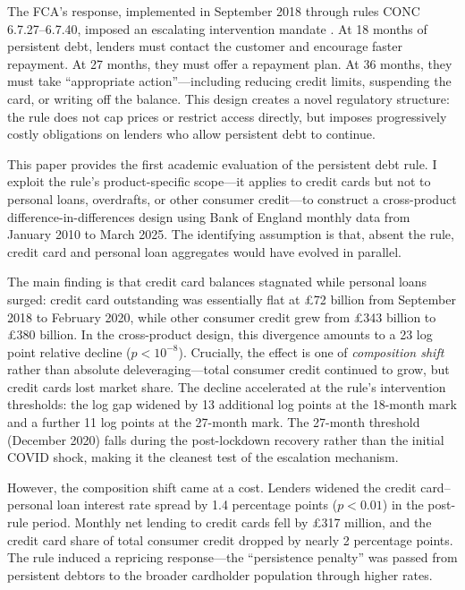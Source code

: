 \documentclass[12pt]{article}
\begin{document}
The FCA's response, implemented in September 2018 through rules CONC 6.7.27--6.7.40, imposed an escalating intervention mandate \citep{fca2018ps184}. At 18 months of persistent debt, lenders must contact the customer and encourage faster repayment. At 27 months, they must offer a repayment plan. At 36 months, they must take ``appropriate action''---including reducing credit limits, suspending the card, or writing off the balance. This design creates a novel regulatory structure: the rule does not cap prices or restrict access directly, but imposes progressively costly obligations on lenders who allow persistent debt to continue.

This paper provides the first academic evaluation of the persistent debt rule. I exploit the rule's product-specific scope---it applies to credit cards but not to personal loans, overdrafts, or other consumer credit---to construct a cross-product difference-in-differences design using Bank of England monthly data from January 2010 to March 2025. The identifying assumption is that, absent the rule, credit card and personal loan aggregates would have evolved in parallel.

The main finding is that credit card balances stagnated while personal loans surged: credit card outstanding was essentially flat at \pounds72 billion from September 2018 to February 2020, while other consumer credit grew from \pounds343 billion to \pounds380 billion. In the cross-product design, this divergence amounts to a 23 log point relative decline ($p < 10^{-8}$). Crucially, the effect is one of \textit{composition shift} rather than absolute deleveraging---total consumer credit continued to grow, but credit cards lost market share. The decline accelerated at the rule's intervention thresholds: the log gap widened by 13 additional log points at the 18-month mark and a further 11 log points at the 27-month mark. The 27-month threshold (December 2020) falls during the post-lockdown recovery rather than the initial COVID shock, making it the cleanest test of the escalation mechanism.

However, the composition shift came at a cost. Lenders widened the credit card--personal loan interest rate spread by 1.4 percentage points ($p < 0.01$) in the post-rule period. Monthly net lending to credit cards fell by \pounds317 million, and the credit card share of total consumer credit dropped by nearly 2 percentage points. The rule induced a repricing response---the ``persistence penalty'' was passed from persistent debtors to the broader cardholder population through higher rates.
\end{document}
